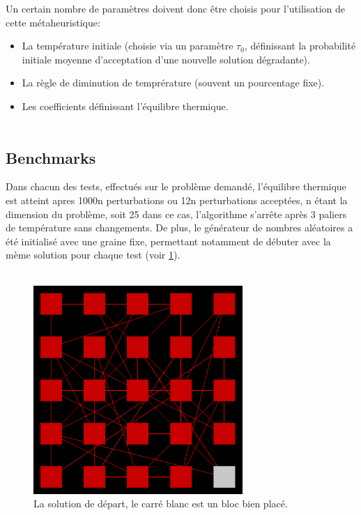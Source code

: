 \documentclass{report}
\begin{document}
Un certain nombre de param\`etres doivent donc \^etre choisis pour l'utilisation
de cette m\'etaheuristique:
\begin{itemize}
	\item La temp\'erature initiale (choisie via un param\`etre $\tau_{0}$, 
	d\'efinissant la probabilit\'e initiale moyenne d'acceptation d'une nouvelle
	solution d\'egradante).
	\item La r\`egle de diminution de tempr\'erature (souvent un pourcentage fixe).
	\item Les coefficients d\'efinissant l'\'equilibre thermique.\\\\
\end{itemize}


\subsection{Benchmarks}

Dans chacun des tests, effectu\'es sur le probl\`eme
demand\'e, l'\'equilibre thermique est atteint apres 1000n perturbations ou 12n
perturbations accept\'ees, n \'etant la dimension du probl\`eme, soit 25 dans ce
cas, l'algorithme s'arr\^ete apr\`es 3 paliers de temp\'erature sans
changements. De plus, le g\'en\'erateur de nombres al\'eatoires a \'et\'e
initialis\'e avec une graine fixe, permettant notamment de d\'ebuter avec
la m\`eme solution pour chaque test (voir \ref{depart}).\\\\


\begin{figure}[H]
  \centering
  \includegraphics[width=300px]{start.png}
  \caption{La solution de d\'epart, le carr\'e blanc est un bloc bien plac\'e.}
  \label{depart}
\end{figure}
\end{document}
